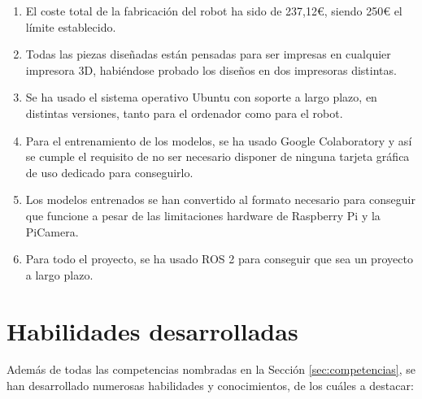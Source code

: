 \begin{enumerate}
	\item El coste total de la fabricación del robot ha sido de 237,12€, siendo 250€ el límite establecido.
	\item Todas las piezas diseñadas están pensadas para ser impresas en cualquier impresora 3D, habiéndose probado los diseños en dos impresoras distintas.
	\item Se ha usado el sistema operativo Ubuntu con soporte a largo plazo, en distintas versiones, tanto para el ordenador como para el robot.
	\item Para el entrenamiento de los modelos, se ha usado Google Colaboratory y así se cumple el requisito de no ser necesario disponer de ninguna tarjeta gráfica de uso dedicado para conseguirlo.
	\item Los modelos entrenados se han convertido al formato necesario para conseguir que funcione a pesar de las limitaciones hardware de Raspberry Pi y la PiCamera.
	\item Para todo el proyecto, se ha usado ROS 2 para conseguir que sea un proyecto a largo plazo.
\end{enumerate}

\section{Habilidades desarrolladas}

Además de todas las competencias nombradas en la Sección \ref{sec:competencias}, se han desarrollado numerosas habilidades y conocimientos, de los cuáles a destacar: 


